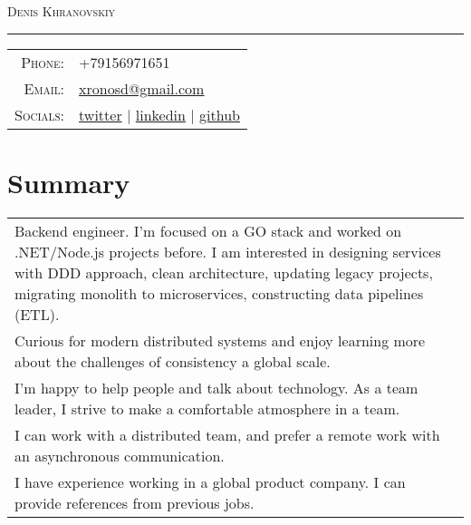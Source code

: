\documentclass[a4paper,11pt]{article}
\newcommand{\sotag}[1]{\tikz[baseline]{\node[anchor=base, rounded corners=0.5ex, text height=1.5ex, text depth=.25ex, fill=tagbg, draw=tagbg, text=tagtxt] {#1};}}
\begin{document}
\par{\centering
		{\Huge \textsc{Denis Khranovskiy}
	}\bigskip\par}

\hrule
\vspace{0.5em}
\begin{tabular}{rl}
  \textsc{Phone:}     & +79156971651\\
  \textsc{Email:}     & \href{mailto:xronosd@gmail.com}{xronosd@gmail.com}\\
  \textsc{Socials:}   %
                      & \faTwitter{} \href{https://twitter.com/xronosd}{twitter} 
                      | \faLinkedin{} \href{https://www.linkedin.com/in/denis-khranovskiy/}{linkedin}
                      | \faGithub{} \href{https://github.com/khranovskiy/}{github}
\end{tabular}

\section{Summary}
\begin{tabular}{p{}}
  Backend engineer. I'm focused on a GO stack and worked on .NET/Node.js projects before. I am interested in designing services with DDD approach, clean architecture, updating legacy projects, migrating monolith to microservices, constructing data pipelines (ETL). \\ 
  Curious for modern distributed systems and enjoy learning more about the challenges of consistency a global scale. \\  
  I'm happy to help people and talk about technology. As a team leader, I strive to make a comfortable atmosphere in a team. \\
  I can work with a distributed team, and prefer a remote work with an asynchronous communication. \\ 
  I have experience working in a global product company. I can provide references from previous jobs.
\end{tabular}
\end{document}
